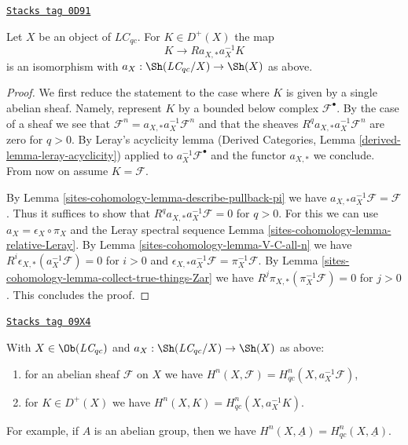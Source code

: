 \begin{lemma}
\label{sites-cohomology-lemma-cohomological-descent-LC}
\href{https://stacks.math.columbia.edu/tag/0D91}{\texttt{Stacks tag 0D91}}

Let $X$ be an object of $\textit{LC}_{qc}$. For $K \in D^+(X)$ the map
$$
K \longrightarrow Ra_{X, *}a_X^{-1}K
$$
is an isomorphism with $a_X : \Sh(\textit{LC}_{qc}/X) \to \Sh(X)$ as above.
\end{lemma}

\begin{proof}
We first reduce the statement to the case where
$K$ is given by a single abelian sheaf. Namely, represent $K$
by a bounded below complex $\mathcal{F}^\bullet$. By the case of a
sheaf we see that
$\mathcal{F}^n = a_{X, *} a_X^{-1} \mathcal{F}^n$
and that the sheaves $R^qa_{X, *}a_X^{-1}\mathcal{F}^n$
are zero for $q > 0$. By Leray's acyclicity lemma
(Derived Categories, Lemma \ref{derived-lemma-leray-acyclicity})
applied to $a_X^{-1}\mathcal{F}^\bullet$
and the functor $a_{X, *}$ we conclude. From now on assume $K = \mathcal{F}$.

\medskip\noindent
By Lemma \ref{sites-cohomology-lemma-describe-pullback-pi} we have
$a_{X, *}a_X^{-1}\mathcal{F} = \mathcal{F}$. Thus it suffices to show that
$R^qa_{X, *}a_X^{-1}\mathcal{F} = 0$ for $q > 0$.
For this we can use $a_X = \epsilon_X \circ \pi_X$ and
the Leray spectral sequence Lemma \ref{sites-cohomology-lemma-relative-Leray}.
By Lemma \ref{sites-cohomology-lemma-V-C-all-n}
we have $R^i\epsilon_{X, *}(a_X^{-1}\mathcal{F}) = 0$ for $i > 0$
and $\epsilon_{X, *}a_X^{-1}\mathcal{F} = \pi_X^{-1}\mathcal{F}$.
By Lemma \ref{sites-cohomology-lemma-collect-true-things-Zar} we have
$R^j\pi_{X, *}(\pi_X^{-1}\mathcal{F}) = 0$ for $j > 0$.
This concludes the proof.
\end{proof}

\begin{lemma}
\label{sites-cohomology-lemma-compare-cohomology-LC}
\href{https://stacks.math.columbia.edu/tag/09X4}{\texttt{Stacks tag 09X4}}

With $X \in \Ob(\textit{LC}_{qc})$ and
$a_X : \Sh(\textit{LC}_{qc}/X) \to \Sh(X)$ as above:
\begin{enumerate}
\item for an abelian sheaf $\mathcal{F}$ on $X$ we have
$H^n(X, \mathcal{F}) = H^n_{qc}(X, a_X^{-1}\mathcal{F})$,
\item for $K \in D^+(X)$ we have $H^n(X, K) = H^n_{qc}(X, a_X^{-1}K)$.
\end{enumerate}
For example, if $A$ is an abelian group, then we have
$H^n(X, \underline{A}) = H^n_{qc}(X, \underline{A})$.
\end{lemma}

